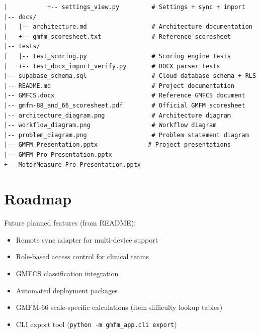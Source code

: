 \documentclass[12pt,a4paper]{article}
\begin{document}
\begin{lstlisting}[basicstyle=\ttfamily\scriptsize, frame=none, backgroundcolor=\color{codebg}]
|           +-- settings_view.py         # Settings + sync + import
|-- docs/
|   |-- architecture.md                  # Architecture documentation
|   +-- gmfm_scoresheet.txt              # Reference scoresheet
|-- tests/
|   |-- test_scoring.py                  # Scoring engine tests
|   +-- test_docx_import_verify.py       # DOCX parser tests
|-- supabase_schema.sql                  # Cloud database schema + RLS
|-- README.md                            # Project documentation
|-- GMFCS.docx                           # Reference GMFCS document
|-- gmfm-88_and_66_scoresheet.pdf        # Official GMFM scoresheet
|-- architecture_diagram.png             # Architecture diagram
|-- workflow_diagram.png                 # Workflow diagram
|-- problem_diagram.png                  # Problem statement diagram
|-- GMFM_Presentation.pptx              # Project presentations
|-- GMFM_Pro_Presentation.pptx
+-- MotorMeasure_Pro_Presentation.pptx
\end{lstlisting}

\section{Roadmap}

Future planned features (from README):

\begin{itemize}[leftmargin=2em]
    \item[$\square$] Remote sync adapter for multi-device support
    \item[$\square$] Role-based access control for clinical teams
    \item[$\square$] GMFCS classification integration
    \item[$\square$] Automated deployment packages
    \item[$\square$] GMFM-66 scale-specific calculations (item difficulty lookup tables)
    \item[$\square$] CLI export tool (\texttt{python -m gmfm\_app.cli export})
\end{itemize}

\end{document}
